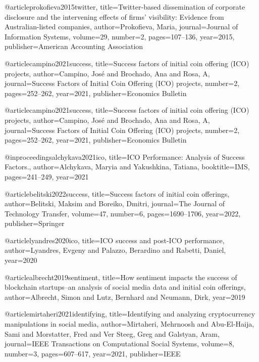 @article{prokofieva2015twitter,
  title={Twitter-based dissemination of corporate disclosure and the intervening effects of firms' visibility: Evidence from Australian-listed companies},
  author={Prokofieva, Maria},
  journal={Journal of Information Systems},
  volume={29},
  number={2},
  pages={107--136},
  year={2015},
  publisher={American Accounting Association}
}

@article{campino2021success,
  title={Success factors of initial coin offering (ICO) projects},
  author={Campino, Jos{\'e} and Brochado, Ana and Rosa, A},
  journal={Success Factors of Initial Coin Offering (ICO) projects},
  number={2},
  pages={252--262},
  year={2021},
  publisher={Economics Bulletin}
}

@article{campino2021success,
  title={Success factors of initial coin offering (ICO) projects},
  author={Campino, Jos{\'e} and Brochado, Ana and Rosa, A},
  journal={Success Factors of Initial Coin Offering (ICO) projects},
  number={2},
  pages={252--262},
  year={2021},
  publisher={Economics Bulletin}
}

@inproceedings{alchykava2021ico,
  title={ICO Performance: Analysis of Success Factors.},
  author={Alchykava, Maryia and Yakushkina, Tatiana},
  booktitle={IMS},
  pages={241--249},
  year={2021}
}

@article{belitski2022success,
  title={Success factors of initial coin offerings},
  author={Belitski, Maksim and Boreiko, Dmitri},
  journal={The Journal of Technology Transfer},
  volume={47},
  number={6},
  pages={1690--1706},
  year={2022},
  publisher={Springer}
}

@article{lyandres2020ico,
  title={ICO success and post-ICO performance},
  author={Lyandres, Evgeny and Palazzo, Berardino and Rabetti, Daniel},
  year={2020}
}

@article{albrecht2019sentiment,
  title={How sentiment impacts the success of blockchain startups--an analysis of social media data and initial coin offerings},
  author={Albrecht, Simon and Lutz, Bernhard and Neumann, Dirk},
  year={2019}
}

@article{mirtaheri2021identifying,
  title={Identifying and analyzing cryptocurrency manipulations in social media},
  author={Mirtaheri, Mehrnoosh and Abu-El-Haija, Sami and Morstatter, Fred and Ver Steeg, Greg and Galstyan, Aram},
  journal={IEEE Transactions on Computational Social Systems},
  volume={8},
  number={3},
  pages={607--617},
  year={2021},
  publisher={IEEE}
}

